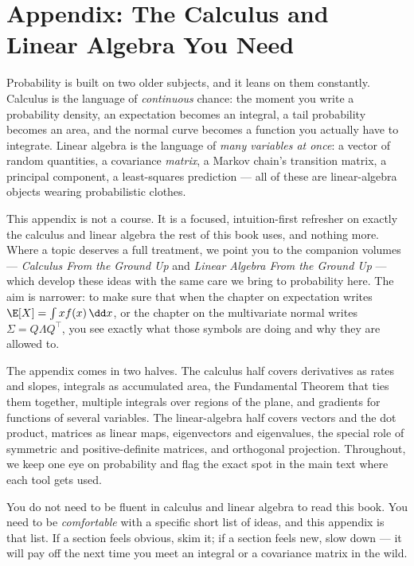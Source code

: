 \chapter{Appendix: The Calculus and Linear Algebra You Need}
\label{chAcla:start}

Probability is built on two older subjects, and it leans on them constantly. Calculus is the
language of \emph{continuous} chance: the moment you write a probability density, an expectation
becomes an integral, a tail probability becomes an area, and the normal curve becomes a function you
actually have to integrate. Linear algebra is the language of \emph{many variables at once}: a vector
of random quantities, a covariance \emph{matrix}, a Markov chain's transition matrix, a principal
component, a least-squares prediction --- all of these are linear-algebra objects wearing
probabilistic clothes.

This appendix is not a course. It is a focused, intuition-first refresher on exactly the calculus and
linear algebra the rest of this book uses, and nothing more. Where a topic deserves a full treatment,
we point you to the companion volumes --- \emph{Calculus From the Ground Up} and \emph{Linear Algebra
From the Ground Up} --- which develop these ideas with the same care we bring to probability here. The
aim is narrower: to make sure that when the chapter on expectation writes $\E[X]=\int x f(x)\,\dd x$,
or the chapter on the multivariate normal writes $\Sigma = Q \Lambda Q^\top$, you see exactly what
those symbols are doing and why they are allowed to.

The appendix comes in two halves. The calculus half covers derivatives as rates and slopes, integrals
as accumulated area, the Fundamental Theorem that ties them together, multiple integrals over regions
of the plane, and gradients for functions of several variables. The linear-algebra half covers vectors
and the dot product, matrices as linear maps, eigenvectors and eigenvalues, the special role of
symmetric and positive-definite matrices, and orthogonal projection. Throughout, we keep one eye on
probability and flag the exact spot in the main text where each tool gets used.

\begin{focusbox}
You do not need to be fluent in calculus and linear algebra to read this book. You need to be
\emph{comfortable} with a specific short list of ideas, and this appendix is that list. If a section
feels obvious, skim it; if a section feels new, slow down --- it will pay off the next time you meet
an integral or a covariance matrix in the wild.
\end{focusbox}

